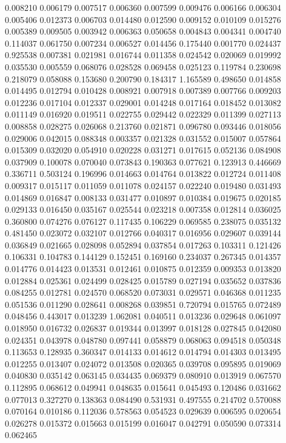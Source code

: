 0.008210
0.006179
0.007517
0.006360
0.007599
0.009476
0.006166
0.006304
0.005406
0.012373
0.006703
0.014480
0.012590
0.009152
0.010109
0.015276
0.005389
0.009505
0.003942
0.006363
0.050658
0.004843
0.004341
0.004740
0.114037
0.061750
0.007234
0.006527
0.014456
0.175440
0.001770
0.024437
0.925538
0.007381
0.021981
0.016744
0.011358
0.024542
0.020069
0.019992
0.035530
0.005559
0.068076
0.028528
0.069458
0.025123
0.119784
0.230698
0.218079
0.058088
0.153680
0.200790
0.184317
1.165589
0.498650
0.014858
0.014495
0.012794
0.010428
0.008921
0.007918
0.007389
0.007766
0.009203
0.012236
0.017104
0.012337
0.029001
0.014248
0.017164
0.018452
0.013082
0.011149
0.016920
0.019511
0.022755
0.029442
0.022329
0.011399
0.027113
0.008858
0.028275
0.026068
0.213760
0.021871
0.096780
0.093446
0.018056
0.029006
0.042015
0.088348
0.003357
0.021328
0.031552
0.015007
0.057864
0.015309
0.032020
0.054910
0.020228
0.031271
0.017615
0.052136
0.084908
0.037909
0.100078
0.070040
0.073843
0.190363
0.077621
0.123913
0.446669
0.336711
0.503124
0.196996
0.014663
0.014764
0.013822
0.012724
0.011408
0.009317
0.015117
0.011059
0.011078
0.024157
0.022240
0.019480
0.031493
0.014869
0.016847
0.008133
0.031477
0.010897
0.010384
0.019675
0.020185
0.029133
0.016450
0.035167
0.025544
0.023218
0.007358
0.012814
0.036025
0.360800
0.074276
0.076127
0.117435
0.106229
0.069585
0.238075
0.035132
0.481450
0.023072
0.032107
0.012766
0.040317
0.016956
0.029607
0.039144
0.036849
0.021665
0.028098
0.052894
0.037854
0.017263
0.103311
0.121426
0.106331
0.104783
0.144129
0.152451
0.169160
0.234037
0.267345
0.014357
0.014776
0.014423
0.013531
0.012461
0.010875
0.012359
0.009353
0.013820
0.012884
0.025361
0.024499
0.028425
0.015789
0.027194
0.035652
0.037836
0.084255
0.012781
0.024570
0.068520
0.073031
0.029571
0.046368
0.011235
0.051536
0.011290
0.028641
0.008268
0.039851
0.720794
0.015765
0.072489
0.048456
0.443017
0.013239
1.062081
0.040511
0.013236
0.029648
0.061097
0.018950
0.016732
0.026837
0.019344
0.013997
0.018128
0.027845
0.042080
0.024351
0.043978
0.048780
0.097441
0.058879
0.068063
0.094518
0.050348
0.113653
0.128935
0.360347
0.014133
0.014612
0.014794
0.014303
0.013495
0.012255
0.013407
0.024072
0.013508
0.020365
0.039708
0.095895
0.019069
0.040830
0.035142
0.063145
0.034435
0.069379
0.080910
0.013919
0.067570
0.112895
0.068612
0.049941
0.048635
0.015641
0.045493
0.120486
0.031662
0.077013
0.327270
0.138363
0.084490
0.531931
0.497555
0.214702
0.570088
0.070164
0.010186
0.112036
0.578563
0.054523
0.029639
0.006595
0.020654
0.026278
0.015372
0.015663
0.015199
0.016047
0.042791
0.050590
0.073314
0.062465
